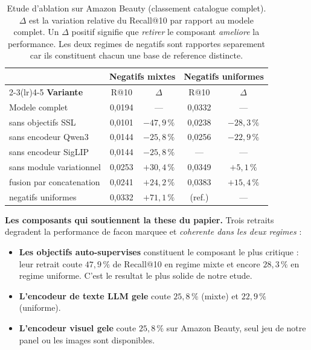 \begin{table}[t]
\centering
\caption{Etude d'ablation sur Amazon Beauty (classement catalogue complet).
$\Delta$ est la variation relative du Recall@10 par rapport au modele complet.
Un $\Delta$ positif signifie que \emph{retirer} le composant \emph{ameliore} la
performance. Les deux regimes de negatifs sont rapportes separement car ils
constituent chacun une base de reference distincte.}
\label{tab:ablation}
\small
\begin{tabular}{lcccc}
\toprule
& \multicolumn{2}{c}{\textbf{Negatifs mixtes}} & \multicolumn{2}{c}{\textbf{Negatifs uniformes}} \\
\cmidrule(lr){2-3}\cmidrule(lr){4-5}
\textbf{Variante} & R@10 & $\Delta$ & R@10 & $\Delta$ \\
\midrule
Modele complet            & 0,0194 & ---      & 0,0332 & --- \\
\midrule
sans objectifs SSL        & 0,0101 & $-47{,}9\,\%$ & 0,0238 & $-28{,}3\,\%$ \\
sans encodeur Qwen3       & 0,0144 & $-25{,}8\,\%$ & 0,0256 & $-22{,}9\,\%$ \\
sans encodeur SigLIP      & 0,0144 & $-25{,}8\,\%$ & ---    & --- \\
\midrule
sans module variationnel  & 0,0253 & $+30{,}4\,\%$ & 0,0349 & $+5{,}1\,\%$ \\
fusion par concatenation  & 0,0241 & $+24{,}2\,\%$ & 0,0383 & $+15{,}4\,\%$ \\
negatifs uniformes        & 0,0332 & $+71{,}1\,\%$ & (ref.) & --- \\
\bottomrule
\end{tabular}
\end{table}

\textbf{Les composants qui soutiennent la these du papier.} Trois retraits
degradent la performance de facon marquee et \emph{coherente dans les deux
regimes} :

\begin{itemize}
\item \textbf{Les objectifs auto-supervises} constituent le composant le plus
  critique : leur retrait coute $47{,}9\,\%$ de Recall@10 en regime mixte et
  encore $28{,}3\,\%$ en regime uniforme. C'est le resultat le plus solide de
  notre etude.
\item \textbf{L'encodeur de texte LLM gele} coute $25{,}8\,\%$ (mixte) et
  $22{,}9\,\%$ (uniforme).
\item \textbf{L'encodeur visuel gele} coute $25{,}8\,\%$ sur Amazon Beauty,
  seul jeu de notre panel ou les images sont disponibles.
\end{itemize}

